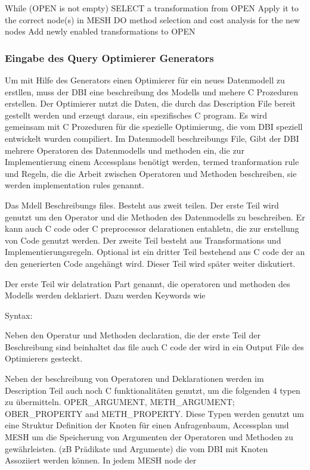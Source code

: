 While (OPEN is not empty)
	SELECT a transformation from OPEN
	Apply it to the correct node(s) in MESH
	DO method selection and cost analysis for the new nodes
	Add newly enabled transformations to OPEN

\subsubsection{Eingabe des Query Optimierer Generators}

Um mit Hilfe des Generators einen Optimierer für ein neues Datenmodell zu erstllen, muss der DBI eine beschreibung des Modells und mehere C Prozeduren erstellen. Der Optimierer nutzt die Daten, die durch das Description File bereit gestellt werden und erzeugt daraus, ein spezifisches C program. Es wird gemeinsam mit C Prozeduren für die spezielle Optimierung, die vom DBI speziell entwickelt wurden  compiliert.
Im Datenmodell beschreibungs File, Gibt der DBI mehrere Operatoren des Datenmodells und methoden ein, die zur Implementierung einem Accessplans benötigt werden, termed tranformation rule und Regeln, die die Arbeit zwischen Operatoren und Methoden beschreiben, sie werden implementation rules genannt.

Das Mdell Beschreibungs files. Besteht aus zweit teilen. Der erste Teil wird genutzt um den Operator und die Methoden des Datenmodells zu beschreiben. Er kann auch C code oder C preprocessor delarationen entahletn, die zur erstellung von Code genutzt werden. Der zweite Teil besteht aus Transformations und Implementierungsregeln. Optional ist ein dritter Teil bestehend aus C code der an den generierten Code angehängt wird. Dieser Teil wird später weiter diskutiert.

Der erste Teil wir delatration Part genannt, die operatoren und methoden des Modells werden deklariert. Dazu werden Keywords wie %

Syntax: %


Neben den Operatur und Methoden declaration, die der erste Teil der Beschreibung sind beinhaltet das file auch C code der wird in ein Output File des Optimierers gesteckt. 


Neben der beschreibung von Operatoren und Deklarationen werden im Description Teil auch noch C funktionalitäten genutzt, um die folgenden 4 typen zu übermitteln. OPER_ARGUMENT, METH_ARGUMENT; OBER_PROPERTY and METH_PROPERTY. Diese Typen werden genutzt um eine Struktur Definition der Knoten für einen Anfragenbaum, Accessplan und MESH um die Speicherung von Argumenten der Operatoren und Methoden zu gewährleisten. (zB Prädikate und Argumente) die vom DBI mit Knoten Assoziiert werden können. In jedem MESH node der 


